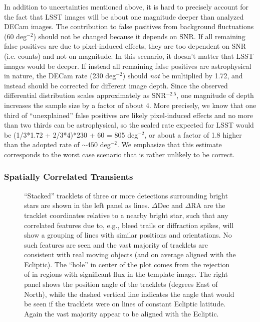 In addition to uncertainties mentioned above, it is hard to precisely account for 
the fact that LSST images will be about one magnitude deeper than analyzed DECam 
images. The contribution to false positives from background fluctuations 
(60 deg$^{-2}$) should not be changed because it depends on SNR. If all remaining
false positives are due to pixel-induced effects, they are too dependent on SNR 
(i.e. counts) and not on magnitude. In this scenario, it doesn’t matter that LSST
images would be deeper. If instead all remaining false positives are astrophysical 
in nature, the DECam rate (230 deg$^{-2}$) should {\it not} be multiplied by 1.72,
and instead should be corrected for different image depth.  Since the observed differential
\DIASource distribution scales approximately as SNR$^{-2.5}$, one magnitude of 
depth increases the sample size by a factor of about 4. More precisely, we know
that one third of ``unexplained'' false positives are likely pixel-induced effects
and no more than two thirds can be astrophysical, so the scaled rate expected
for LSST would be (1/3*1.72 + 2/3*4)*230 + 60 = 805 deg$^{-2}$, or about 
a factor of 1.8 higher than the adopted rate of $\sim450$ deg$^{-2}$. We emphasize
that this estimate corresponds to the worst case scenario that is rather unlikely
to be correct. 
  


\subsubsection{Spatially Correlated Transients}

\begin{figure}
  \centering
  \caption{
   ``Stacked'' tracklets of three or more detections surrounding bright stars are shown in the left panel
  as lines. $\Delta \textrm{Dec}$ and $\Delta \textrm{RA}$ are the tracklet coordinates relative to a nearby
  bright star, such that any correlated features due to, e.g., bleed trails or
  diffraction spikes, will show a grouping of lines with similar positions and
  orientations. No such features are seen and the vast majority of
  tracklets are consistent with real moving objects (and on average aligned with
  the Ecliptic). The ``hole'' in center of the plot comes from the rejection of \DIASources
  in regions with significant flux in the template image. The right panel shows
  the position angle of the tracklets (degrees East of North), while the dashed
  vertical line indicates the angle that would be seen if the tracklets were on
  lines of constant Ecliptic latitude. Again the vast majority appear to be
  aligned with the Ecliptic.
  }
  \label{fig:stacked_tracklets}
\end{figure}

